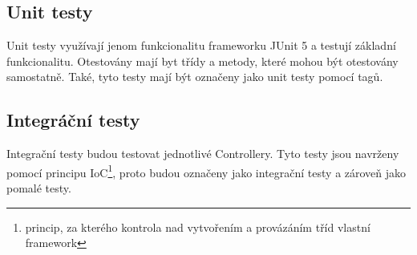     \subsection{Unit testy}
        Unit testy využívají jenom funkcionalitu frameworku JUnit 5 a testují základní funkcionalitu. Otestovány mají byt třídy a metody, které mohou být otestovány samostatně. Také, tyto testy mají být označeny jako unit testy pomocí tagů.  %
        
    \subsection{Integráční testy}
        Integrační testy budou testovat jednotlivé Controllery. Tyto testy jsou navrženy pomocí principu IoC\footnote{princip, za kterého kontrola nad vytvořením a provázáním tříd vlastní framework}, proto budou označeny jako integrační testy a zároveň jako pomalé testy.